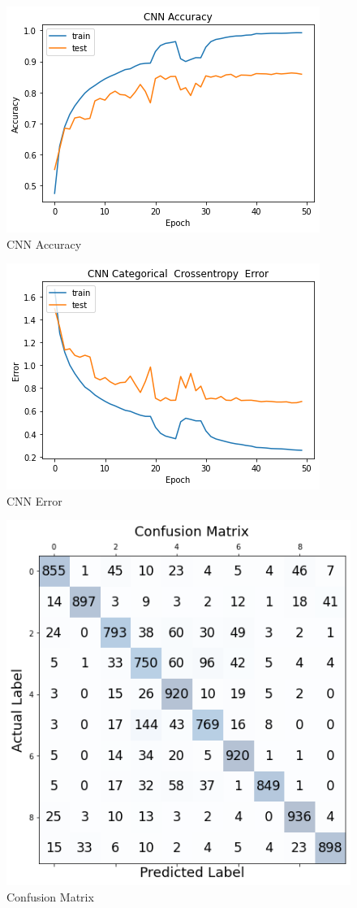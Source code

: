 \documentclass[10pt,twocolumn,letterpaper]{article}
\begin{document}
\begin{figure}[H]
\centering
\label{fig:acc}
\includegraphics[scale = 0.6]{images/best_accuracy.png}
\caption{CNN Accuracy}
\end{figure}

\begin{figure}[H]
\centering
\label{fig:err}
\includegraphics[scale = 0.6]{images/best_error.png}
\caption{CNN Error}
\end{figure}

\begin{figure}[H]
\centering
\label{fig:conf}
\includegraphics[scale = 0.45]{images/best_acc_conf_matrix.png}
\caption{Confusion Matrix }
\end{figure}
\end{document}
